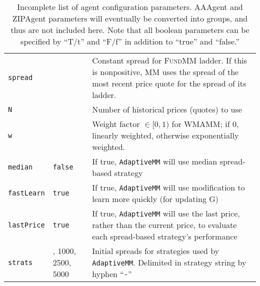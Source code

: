 \documentclass[11pt]{article}
\begin{document}
\begin{table}
\begin{tabular}{p{} >{\centering\arraybackslash}p{} p{}}
\verb|spread| & -1 &	 Constant spread for \textsc{FundMM} ladder. If this is nonpositive, MM uses the spread of the most recent price quote for the spread of its ladder. \\
\verb|N| 	& 5 & Number of historical prices (quotes) to use \\
\verb|w| 	& 0 & Weight factor $\in [0,1)$ for \textsc{WMAMM}; if 0, linearly weighted, otherwise exponentially weighted. \\

\verb|median| 	& \verb|false|	& If true, \verb|AdaptiveMM| will use median spread-based strategy \\
\verb|fastLearn|	 & \verb|true| & If true, \verb|AdaptiveMM| will use modification to learn more quickly (for updating G) \\
\verb|lastPrice| & \verb|true| & If true, \verb|AdaptiveMM| will use the last price, rather than the current price, to evaluate each spread-based strategy's performance \\
\verb|strats| 	& 500, 1000, 2500, 5000 & Initial spreads for strategies used by \verb|AdaptiveMM|. Delimited in strategy string by hyphen ``\verb|-|'' \\

\end{tabular}
\caption{Incomplete list of agent configuration parameters. AAAgent and ZIPAgent parameters will eventually be converted into groups, and thus are not included here. Note that all boolean parameters can be specified by ``T/t'' and ``F/f'' in addition to ``true'' and ``false.''}
\label{tab:ag}
\end{table}
\end{document}
